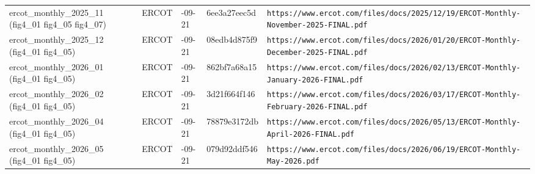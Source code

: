 \begin{longtable}{>{\raggedright\arraybackslash}p{3.0cm}>{\raggedright\arraybackslash}p{1.5cm}>{\raggedright\arraybackslash}p{1.4cm}>{\raggedright\arraybackslash}p{2.0cm}>{\raggedright\arraybackslash}p{6.0cm}}
ercot\_\allowbreak{}monthly\_\allowbreak{}2025\_\allowbreak{}11 (fig4\_\allowbreak{}01 fig4\_\allowbreak{}05 fig4\_\allowbreak{}07) & ERCOT & 2026-09-21 & 6ee3a27eec5d & \texttt{https:\allowbreak{}/\allowbreak{}/\allowbreak{}www.\allowbreak{}ercot.\allowbreak{}com/\allowbreak{}files/\allowbreak{}docs/\allowbreak{}2025/\allowbreak{}12/\allowbreak{}19/\allowbreak{}ERCOT-\allowbreak{}Monthly-\allowbreak{}November-\allowbreak{}2025-\allowbreak{}FINAL.\allowbreak{}pdf} \\
ercot\_\allowbreak{}monthly\_\allowbreak{}2025\_\allowbreak{}12 (fig4\_\allowbreak{}01 fig4\_\allowbreak{}05) & ERCOT & 2026-09-21 & 08edb4d875f9 & \texttt{https:\allowbreak{}/\allowbreak{}/\allowbreak{}www.\allowbreak{}ercot.\allowbreak{}com/\allowbreak{}files/\allowbreak{}docs/\allowbreak{}2026/\allowbreak{}01/\allowbreak{}20/\allowbreak{}ERCOT-\allowbreak{}Monthly-\allowbreak{}December-\allowbreak{}2025-\allowbreak{}FINAL.\allowbreak{}pdf} \\
ercot\_\allowbreak{}monthly\_\allowbreak{}2026\_\allowbreak{}01 (fig4\_\allowbreak{}01 fig4\_\allowbreak{}05) & ERCOT & 2026-09-21 & 862bf7a68a15 & \texttt{https:\allowbreak{}/\allowbreak{}/\allowbreak{}www.\allowbreak{}ercot.\allowbreak{}com/\allowbreak{}files/\allowbreak{}docs/\allowbreak{}2026/\allowbreak{}02/\allowbreak{}13/\allowbreak{}ERCOT-\allowbreak{}Monthly-\allowbreak{}January-\allowbreak{}2026-\allowbreak{}FINAL.\allowbreak{}pdf} \\
ercot\_\allowbreak{}monthly\_\allowbreak{}2026\_\allowbreak{}02 (fig4\_\allowbreak{}01 fig4\_\allowbreak{}05) & ERCOT & 2026-09-21 & 3d21f664f146 & \texttt{https:\allowbreak{}/\allowbreak{}/\allowbreak{}www.\allowbreak{}ercot.\allowbreak{}com/\allowbreak{}files/\allowbreak{}docs/\allowbreak{}2026/\allowbreak{}03/\allowbreak{}17/\allowbreak{}ERCOT-\allowbreak{}Monthly-\allowbreak{}February-\allowbreak{}2026-\allowbreak{}FINAL.\allowbreak{}pdf} \\
ercot\_\allowbreak{}monthly\_\allowbreak{}2026\_\allowbreak{}04 (fig4\_\allowbreak{}01 fig4\_\allowbreak{}05) & ERCOT & 2026-09-21 & 78879e3172db & \texttt{https:\allowbreak{}/\allowbreak{}/\allowbreak{}www.\allowbreak{}ercot.\allowbreak{}com/\allowbreak{}files/\allowbreak{}docs/\allowbreak{}2026/\allowbreak{}05/\allowbreak{}13/\allowbreak{}ERCOT-\allowbreak{}Monthly-\allowbreak{}April-\allowbreak{}2026-\allowbreak{}FINAL.\allowbreak{}pdf} \\
ercot\_\allowbreak{}monthly\_\allowbreak{}2026\_\allowbreak{}05 (fig4\_\allowbreak{}01 fig4\_\allowbreak{}05) & ERCOT & 2026-09-21 & 079d92ddf546 & \texttt{https:\allowbreak{}/\allowbreak{}/\allowbreak{}www.\allowbreak{}ercot.\allowbreak{}com/\allowbreak{}files/\allowbreak{}docs/\allowbreak{}2026/\allowbreak{}06/\allowbreak{}19/\allowbreak{}ERCOT-\allowbreak{}Monthly-\allowbreak{}May-\allowbreak{}2026.\allowbreak{}pdf} \\

\end{longtable}
